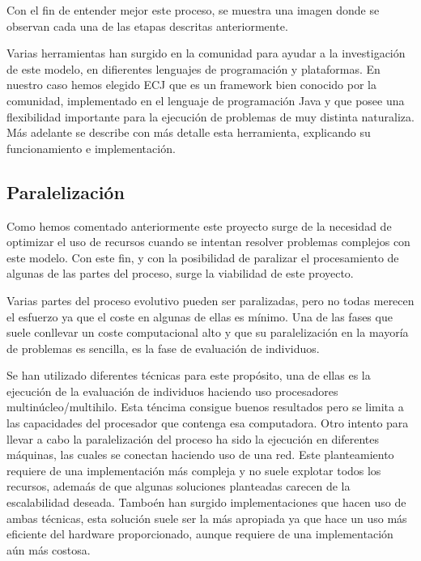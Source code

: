 Con el fin de entender mejor este proceso, se muestra una imagen  donde se observan cada una de las etapas descritas anteriormente.


Varias herramientas han surgido en la comunidad para ayudar a la investigación de este modelo, en difierentes lenguajes de programación y plataformas. En nuestro caso hemos elegido ECJ que es un framework bien conocido por la comunidad, implementado en el lenguaje de programación Java y que posee una flexibilidad importante para la ejecución de problemas de muy distinta naturaliza. M\'as adelante  se describe con m\'as detalle esta herramienta, explicando su funcionamiento e implementación.

\subsection{Paralelizaci\'on\label{analisis-evolutivos-paralelizacion}}

Como hemos comentado anteriormente  este proyecto surge de la necesidad de optimizar el uso de recursos cuando se intentan resolver problemas complejos con este modelo. Con este fin, y con la posibilidad de paralizar el procesamiento de algunas de las partes del proceso, surge la viabilidad de este proyecto.

Varias partes del proceso evolutivo pueden ser paralizadas, pero no todas merecen el esfuerzo ya que el coste en algunas de ellas es mínimo. Una de las fases que suele conllevar un coste computacional alto y que su paralelizaci\'on en la mayoría de problemas es sencilla, es la fase de evaluaci\'on de individuos.

Se han utilizado diferentes técnicas para este prop\'osito, una de ellas es la ejecución de la evaluación de individuos haciendo uso procesadores multin\'ucleo/multihilo. Esta t\'encima consigue buenos resultados pero se limita a las capacidades del procesador que contenga esa computadora. Otro intento para llevar a cabo la paralelizaci\'on del proceso ha sido la ejecución en diferentes m\'aquinas, las cuales se conectan haciendo uso de una red. Este planteamiento requiere de una implementación m\'as compleja y no suele explotar todos los recursos, adema\'as de que algunas soluciones planteadas carecen de la escalabilidad deseada. Tambo\'en han surgido implementaciones que hacen uso de ambas t\'ecnicas, esta solución suele ser la m\'as apropiada ya que hace un uso m\'as eficiente del hardware proporcionado, aunque requiere de una implementación a\'un m\'as costosa.